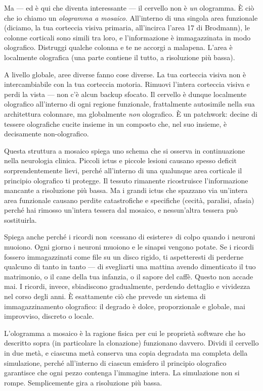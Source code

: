 \documentclass[11pt, twoside, openright]{book}
\begin{document}
Ma --- ed è qui che diventa interessante --- il cervello non è \textit{un} ologramma. È ciò che io chiamo un \textit{ologramma a mosaico}. All'interno di una singola area funzionale (diciamo, la tua corteccia visiva primaria, all'incirca l'area 17 di Brodmann), le colonne corticali sono simili tra loro, e l'informazione è immagazzinata in modo olografico. Distruggi qualche colonna e te ne accorgi a malapena. L'area è localmente olografica (una parte contiene il tutto, a risoluzione più bassa).

A livello globale, aree diverse fanno cose diverse. La tua corteccia visiva non è intercambiabile con la tua corteccia motoria. Rimuovi l'intera corteccia visiva e perdi la vista --- non c'è alcun backup sfocato. Il cervello è dunque localmente olografico all'interno di ogni regione funzionale, frattalmente autosimile nella sua architettura colonnare, ma globalmente \textit{non} olografico. È un patchwork: decine di tessere olografiche cucite insieme in un composto che, nel suo insieme, è decisamente non-olografico.

Questa struttura a mosaico spiega uno schema che si osserva in continuazione nella neurologia clinica. Piccoli ictus e piccole lesioni causano spesso deficit sorprendentemente lievi, perché all'interno di una qualunque area corticale il principio olografico ti protegge. Il tessuto rimanente ricostruisce l'informazione mancante a risoluzione più bassa. Ma i grandi ictus che spazzano via un'intera area funzionale causano perdite catastrofiche e specifiche (cecità, paralisi, afasia) perché hai rimosso un'intera tessera dal mosaico, e nessun'altra tessera può sostituirla.

Spiega anche perché i ricordi non «cessano di esistere» di colpo quando i neuroni muoiono. Ogni giorno i neuroni muoiono e le sinapsi vengono potate. Se i ricordi fossero immagazzinati come file su un disco rigido, ti aspetteresti di perderne qualcuno di tanto in tanto --- di svegliarti una mattina avendo dimenticato il tuo matrimonio, o il cane della tua infanzia, o il sapore del caffè. Questo non accade mai. I ricordi, invece, sbiadiscono gradualmente, perdendo dettaglio e vividezza nel corso degli anni. È esattamente ciò che prevede un sistema di immagazzinamento olografico: il degrado è dolce, proporzionale e globale, mai improvviso, discreto o locale.

L'ologramma a mosaico è la ragione fisica per cui le proprietà software che ho descritto sopra (in particolare la clonazione) funzionano davvero. Dividi il cervello in due metà, e ciascuna metà conserva una copia degradata ma completa della simulazione, perché all'interno di ciascun emisfero il principio olografico garantisce che ogni pezzo contenga l'immagine intera. La simulazione non si rompe. Semplicemente gira a risoluzione più bassa.
\end{document}
